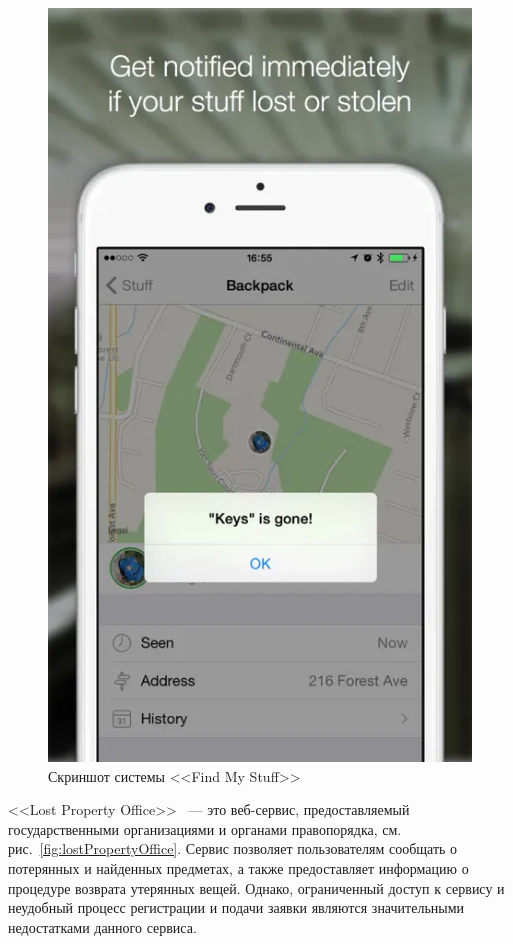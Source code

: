 \documentclass{../mirea}
\begin{document}
	\begin{figure}[htb]
		\centering
		\includegraphics[height=.4\textheight]{../images/findMyStuff2.png}
		\parskip=6pt
		\caption{Скриншот системы <<Find My Stuff>>}
		\label{fig:findMyStuff2}
	\end{figure}
	
	<<Lost Property Office>>~\cite{bib:parliament_lost_and_found} --- это веб-сервис, предоставляемый государственными организациями и органами правопорядка, см. рис.~\ref{fig:lostPropertyOffice}. Сервис позволяет пользователям сообщать о потерянных и найденных предметах, а также предоставляет информацию о процедуре возврата утерянных вещей. Однако, ограниченный доступ к сервису и неудобный процесс регистрации и подачи заявки являются значительными недостатками данного сервиса.
	
\end{document}
